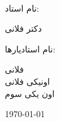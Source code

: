 \begin{titlepage}
\begin{center}
\HRule \\[1.5cm]

\vfill

\begin{minipage}{0.4\textwidth}
\begin{flushright} \Large
    نام استاد:
\end{flushright}
\begin{center} \large
    دکتر فلانی
\end{center}
\end{minipage}

\vspace*{2\baselineskip} 

\begin{minipage}{0.4\textwidth}
\begin{flushright} \Large
    نام استادیار‌ها:
\end{flushright}
\begin{center} \large
فلانی\\
اونیکی فلانی\\
اون یکی سوم
\end{center}
\end{minipage}

\vspace*{12\baselineskip} 

\today

\end{center}

\end{titlepage}